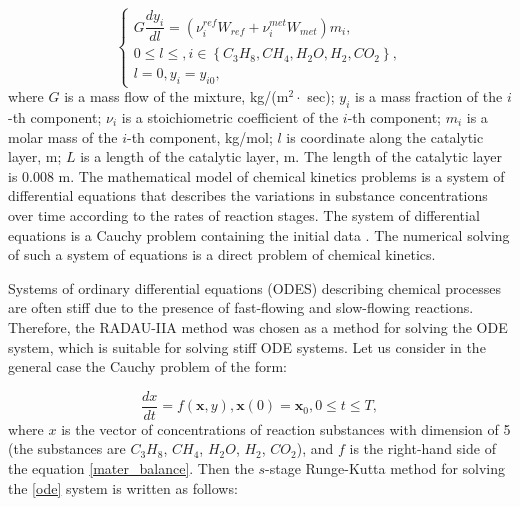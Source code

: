 \documentclass{svproc}
\begin{document}
\begin{equation}\label{mater_balance}
\begin{cases}
G \dfrac{dy_i}{dl} = \left(\nu_i^{ref} W_{ref} + \nu_i^{met} W_{met} \right) m_i, 
\\
0 \le l \le , i \in \left\lbrace C_3H_8, CH_4, H_2O, H_2, CO_2 \right\rbrace,
\\
l = 0, y_i = y_{i0},
\end{cases}
\end{equation}
where $G$ is a mass flow of the mixture, kg/(m$^2 \cdot$ sec); $y_i$ is a mass fraction of the $i$-th component; $\nu_i$ is a stoichiometric coefficient of the $i$-th component; $m_i$ is a molar mass of the $i$-th component, kg/mol; $l$ is coordinate along the catalytic layer, m; $L$ is a length of the catalytic layer, m. The length of the catalytic layer is 0.008 m. The mathematical model of chemical kinetics problems is a system of differential equations that describes the variations in substance concentrations over time according to the rates of reaction stages. The system of differential equations is a Cauchy problem containing the initial data \cite{ENIKEEV2020123131, Chainikova}. The numerical solving of such a system of equations is a direct problem of chemical kinetics. 


Systems of ordinary differential equations (ODES) describing chemical processes are often stiff due to the presence of fast-flowing and slow-flowing reactions. Therefore, the RADAU-IIA method was chosen as a method for solving the ODE system, which is suitable for solving stiff ODE systems. Let us consider in the general case the Cauchy problem of the form:

\begin{equation}\label{ode}
\dfrac{dx}{dt} = f(\textbf{x}, y), \textbf{x}(0) = \textbf{x}_0, 0 \le t \le T,
\end{equation}
where $x$ is the vector of concentrations of reaction substances with dimension of 5 (the substances are $C_3H_8$, $CH_4$, $H_2O$, $H_2$, $CO_2$), and $f$ is the right-hand side of the equation \eqref{mater_balance}. Then the $s$-stage Runge-Kutta method for solving the \eqref{ode} system is written as follows:
\end{document}
